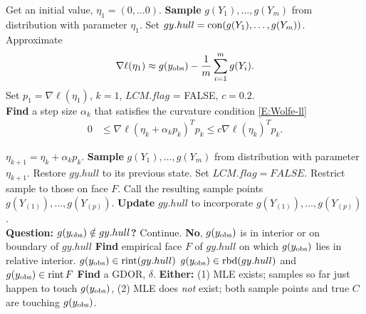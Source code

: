 {\singlespacing 
{ 
\noindent \begin{algorithmic}
\State Get an initial value, $\eta_1 = (0, \ldots 0)$.
\State \textbf{Sample} $g(Y_1), \ldots, g(Y_m)$ from distribution with parameter $\eta_{1}$.  
\State Set $gy.hull = \operatorname{con}(g(Y_1), \ldots, g(Y_m) )$.
\State Approximate 
\begin{align*}
\nabla \ell( \eta_1) \approx g(y_{\text{obs}}) - \frac{1}{m}\sum_{i=1}^m g(Y_i).
\end{align*}
\State Set $p_1 = \nabla \ell( \eta_1)$, $k=1$, $LCM.flag$ = FALSE, $c=0.2$.\\

\State \textbf{Find} a step size $\alpha_k$ that satisfies the curvature condition \eqref{E:Wolfe-ll}
\begin{align*}%
	 0 & \leq \nabla \ell( \eta_k + \alpha_k p_k)^T p_k \leq c \nabla \ell(\eta_k)^T p_k.
\end{align*}

\State $\eta_{k+1} = \eta_k + \alpha_k p_k$.
\State \textbf{Sample} $g(Y_1), \ldots, g(Y_m)$ from distribution with parameter $\eta_{k+1}$.
		\State Restore $gy.hull$ to its previous state.
		\State Set $LCM.flag = FALSE$.
	\Else
		\State Restrict sample to those on face $F$.
	\EndIf
\EndIf
\State Call the resulting sample points $g(Y_{(1)}), \ldots, g(Y_{(p)})$.
\State \textbf{Update} $gy.hull$ to incorporate $g(Y_{(1)}), \ldots, g(Y_{(p)}) $.\\
\State \textbf{Question: $g(y_{\text{obs}}) \notin gy.hull$?}
	\State  Continue.
\Else
\State \textbf{No}, $g(y_{\text{obs}})$ is in interior or on boundary of $gy.hull$
	\State \textbf{Find} empirical face $F$ of $gy.hull$ on which $g(y_{\text{obs}})$ 
	lies in relative interior.
		\State $g(y_{\text{obs}}) \in \operatorname{rint}( gy.hull )$ 
	\Else
	\State $g(y_{\text{obs}}) \in \operatorname{rbd}( gy.hull )$ and $g(y_{\text{obs}}) \in \operatorname{rint} F$
		\State \textbf{Find} a GDOR, $\delta$.
		\State \textbf{Either:}
		\State (1) MLE exists; samples so far just happen to touch $g(y_{\text{obs}})$, 
		\State (2) MLE does \emph{not} exist; both sample points and true $C$ are
		touching $g(y_{\text{obs}})$.


\end{algorithmic}}}
